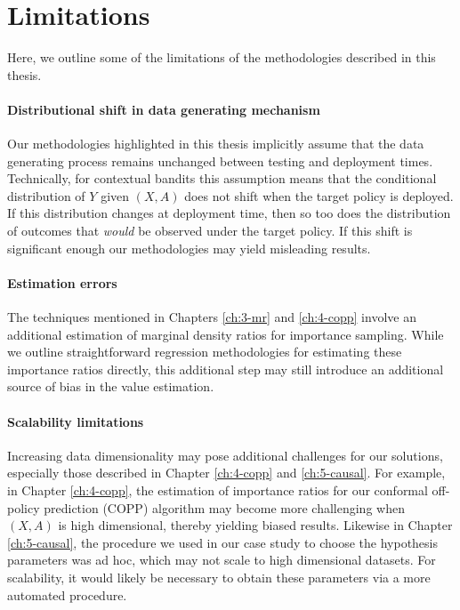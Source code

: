 \section{Limitations}
Here, we outline some of the limitations of the methodologies described in this thesis. 

\paragraph*{Distributional shift in data generating mechanism}
Our methodologies highlighted in this thesis implicitly assume that the data generating process remains unchanged between testing and deployment times. 
Technically, for contextual bandits this assumption means that the conditional distribution of $Y$ given $(X, A)$ does not shift when the target policy is deployed. 
If this distribution changes at deployment time, then so too does the distribution of outcomes that \emph{would} be observed under the target policy. 
If this shift is significant enough our methodologies may yield misleading results.  

\paragraph*{Estimation errors}
The techniques mentioned in Chapters \ref*{ch:3-mr} and \ref*{ch:4-copp} involve an additional estimation of marginal density ratios for importance sampling. 
While we outline straightforward regression methodologies for estimating these importance ratios directly, this additional step may still introduce an additional source of bias in the value estimation. 

\paragraph*{Scalability limitations}
Increasing data dimensionality may pose additional challenges for our solutions, especially those described in Chapter \ref*{ch:4-copp} and \ref*{ch:5-causal}. 
For example, in Chapter \ref*{ch:4-copp}, the estimation of importance ratios for our conformal off-policy prediction (COPP) algorithm may become more challenging when $(X, A)$ is high dimensional, thereby yielding biased results.
Likewise in Chapter \ref*{ch:5-causal}, the procedure we used in our case study to choose the hypothesis parameters was ad hoc, which may not scale to high dimensional datasets.
For scalability, it would likely be necessary to obtain these parameters via a more automated procedure.

